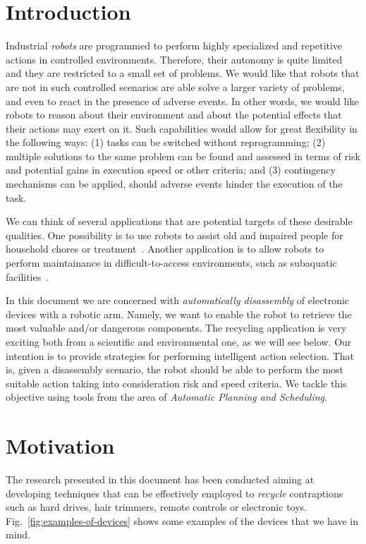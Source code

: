 \documentclass[../root.tex]{subfiles}
\begin{document}
\section{Introduction}
\label{sec:introduction}

Industrial \emph{robots} are programmed to perform highly specialized and
repetitive actions in controlled environments. Therefore, their
autonomy is quite limited and they are restricted to a small set of
problems. We would like that robots that are
not in such controlled scenarios are able solve a larger variety of
problems, and even to react in the presence
of adverse events.
In other words, we
would like robots to reason about their environment and about the
potential effects that their actions may exert on it.
Such capabilities would allow for great flexibility in the following
ways: (1) tasks can be switched without reprogramming; (2) multiple
solutions to the same problem can be found and assessed in terms
of risk and potential gains in execution speed or other criteria; and (3)
contingency mechanisms can be applied, should adverse events hinder
the execution of the task.

We can think of several applications that are potential targets
of these desirable qualities. One possibility is to use robots to assist old and
impaired people for household chores
or treatment~\cite{canal2018adapting,andriella2018deciding}. Another
application is to allow robots to perform maintainance in difficult-to-access
environments, such as subaquatic facilities~\cite{palomeras2016toward,ong2010planning}.

In this document we are concerned with \emph{automatically disassembly}
of electronic devices with a robotic arm. Namely, we want to enable the
robot to retrieve the most valuable and/or dangerous components.
The recycling application is very exciting both from a scientific
and environmental one, as we will see below. Our intention is
to provide strategies for performing intelligent action selection.
That is, given a disassembly scenario, the robot should be able
to perform the most suitable action taking into consideration
risk and speed criteria. We tackle this objective using tools
from the area of \emph{Automatic Planning and Scheduling}.

\section{Motivation}

The research presented in this document has been conducted aiming at
developing techniques that can be effectively employed to \emph{recycle}
contraptions such as hard drives, hair trimmers, remote controls or
electronic toys. Fig.~\ref{fig:examples-of-devices} shows some
examples of the devices that we have in mind.
\end{document}
